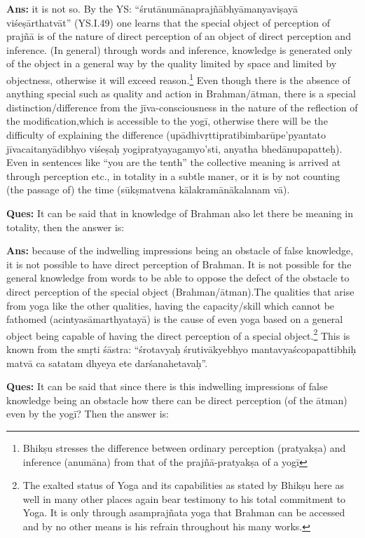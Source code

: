 \textbf{Ans:}  it is not so.  By the YS: “śrutānumānaprajñābhyāmanyaviṣayā viśeṣārthatvāt” (YS.I.49) one learns that the special object of perception of prajñā is of the nature of direct perception of an object of direct perception and inference. (In general) through words and inference, knowledge is generated only of the object in a general way by the quality limited by space and limited by objectness, otherwise it will exceed reason.\footnote{Bhikṣu stresses the difference between ordinary perception (pratyakṣa) and inference (anumāna) from that of the prajñā-pratyakṣa of a yogī} Even though there is the absence of anything special such as quality and action in Brahman/ātman, there is a  special distinction/difference from the jīva-consciousness in the nature of the reflection of the modification,which is accessible to the yogī, otherwise there will be the difficulty of explaining the difference (upādhivṛttipratibimbarūpe’pyantato jīvacaitanyādibhyo viśeṣaḥ yogipratyayagamyo’sti, anyatha bhedānupapatteḥ). Even in sentences like “you are the tenth” the collective meaning is arrived at through perception etc., in totality in a subtle maner, or it is by not counting (the passage of) the time (sūkṣmatvena kālakramānākalanam vā).

\textbf{Ques:} It can be said that in knowledge of Brahman also let there be meaning in totality, then the answer is: 

\textbf{Ans:} because of the indwelling impressions being an obstacle of false knowledge, it is not possible to have direct perception of Brahman. It is not possible for the general knowledge from words to be able to oppose the defect of the obstacle to direct perception of the special object (Brahman/ātman).The qualities that arise from yoga like the other qualities, having the capacity/skill which cannot be fathomed (acintyasāmarthyatayā) is the cause of even yoga based on a general object being capable of  having the direct perception of a special object.\footnote{The exalted status of Yoga and its capabilities as stated by Bhikṣu here as well in many other places again bear testimony to his total commitment to Yoga. It is only through asamprajñata yoga that Brahman can be accessed and by no other means is his refrain throughout his many works.} This is known from the smṛti śāstra: “śrotavyaḥ śrutivākyebhyo mantavyaścopapattibhiḥ matvā ca satatam dhyeya ete darśanahetavaḥ”.

\eject


\textbf{Ques:} It can be said that since there is this indwelling impressions of false knowledge being an obstacle how there can be direct perception (of the ātman) even by the yogī? Then the answer is:

